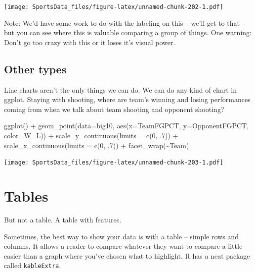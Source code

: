 \documentclass[
]{book}
\newenvironment{Shaded}{\begin{snugshade}}{\end{snugshade}}
\newcommand{\AttributeTok}[1]{\textcolor[rgb]{0.77,0.63,0.00}{#1}}
\newcommand{\DecValTok}[1]{\textcolor[rgb]{0.00,0.00,0.81}{#1}}
\newcommand{\FunctionTok}[1]{\textcolor[rgb]{0.00,0.00,0.00}{#1}}
\newcommand{\NormalTok}[1]{#1}
\newcommand{\SpecialCharTok}[1]{\textcolor[rgb]{0.00,0.00,0.00}{#1}}
\begin{document}
\texttt{[image: SportsData\_files/figure-latex/unnamed-chunk-202-1.pdf]}

Note: We'd have some work to do with the labeling on this -- we'll get to that -- but you can see where this is valuable comparing a group of things. One warning: Don't go too crazy with this or it loses it's visual power.

\hypertarget{other-types}{%
\section{Other types}\label{other-types}}

Line charts aren't the only things we can do. We can do any kind of chart in ggplot. Staying with shooting, where are team's winning and losing performances coming from when we talk about team shooting and opponent shooting?

\begin{Shaded}
\begin{Highlighting}[]
\FunctionTok{ggplot}\NormalTok{() }\SpecialCharTok{+} 
  \FunctionTok{geom\_point}\NormalTok{(}\AttributeTok{data=}\NormalTok{big10, }\FunctionTok{aes}\NormalTok{(}\AttributeTok{x=}\NormalTok{TeamFGPCT, }\AttributeTok{y=}\NormalTok{OpponentFGPCT, }\AttributeTok{color=}\NormalTok{W\_L)) }\SpecialCharTok{+}
  \FunctionTok{scale\_y\_continuous}\NormalTok{(}\AttributeTok{limits =} \FunctionTok{c}\NormalTok{(}\DecValTok{0}\NormalTok{, .}\DecValTok{7}\NormalTok{)) }\SpecialCharTok{+} 
  \FunctionTok{scale\_x\_continuous}\NormalTok{(}\AttributeTok{limits =} \FunctionTok{c}\NormalTok{(}\DecValTok{0}\NormalTok{, .}\DecValTok{7}\NormalTok{)) }\SpecialCharTok{+} 
  \FunctionTok{facet\_wrap}\NormalTok{(}\SpecialCharTok{\textasciitilde{}}\NormalTok{Team)}
\end{Highlighting}
\end{Shaded}

\texttt{[image: SportsData\_files/figure-latex/unnamed-chunk-203-1.pdf]}

\hypertarget{tables}{%
\chapter{Tables}\label{tables}}

But not a table. A table with features.

Sometimes, the best way to show your data is with a table -- simple rows and columns. It allows a reader to compare whatever they want to compare a little easier than a graph where you've chosen what to highlight. R has a neat package called \texttt{kableExtra}.
\end{document}

